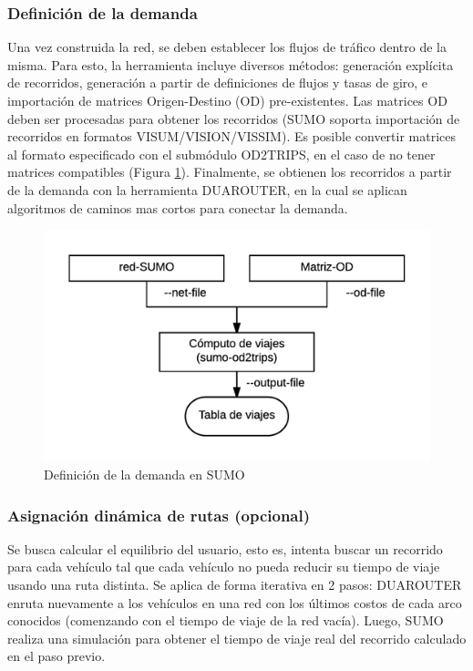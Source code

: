 \subsubsection*{Definición de la demanda}
    Una vez construida la red, se deben establecer los flujos de tráfico dentro de la misma. Para esto, la herramienta incluye diversos métodos: generación explícita de recorridos, generación a partir de definiciones de flujos y tasas de giro, e importación de matrices Origen-Destino (OD) pre-existentes. Las matrices OD deben ser procesadas para obtener los recorridos (SUMO soporta importación de recorridos en formatos VISUM/VISION/VISSIM). Es posible convertir matrices al formato especificado con el submódulo OD2TRIPS, en el caso de no tener matrices compatibles (Figura \ref{fig:sumodemand}). Finalmente, se obtienen los recorridos a partir de la demanda con la herramienta DUAROUTER, en la cual se aplican algoritmos de caminos mas cortos para conectar la demanda. 
    \begin{figure}[!htp]
    	\centering
    	\includegraphics[scale=0.7]{images/sumo-builddemand.png}
    	\caption{Definición de la demanda en SUMO}
        \label{fig:sumodemand}
    \end{figure}
    
\subsubsection*{Asignación dinámica de rutas (opcional)}
    Se busca calcular el equilibrio del usuario, esto es, intenta buscar un recorrido para cada vehículo tal que cada vehículo no pueda reducir su tiempo de viaje usando una ruta distinta. Se aplica de forma iterativa en 2 pasos: DUAROUTER enruta nuevamente a los vehículos en una red con los últimos costos de cada arco conocidos (comenzando con el tiempo de viaje de la red vacía). Luego, SUMO realiza una simulación para obtener el tiempo de viaje real del recorrido calculado en el paso previo.
    
